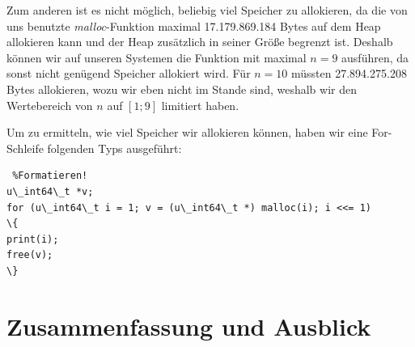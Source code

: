 \documentclass[course=asp]{aspdoc}
\begin{document}
Zum anderen ist es nicht m\"oglich, beliebig viel Speicher zu allokieren, da die von uns benutzte \textit{malloc}-Funktion maximal 17.179.869.184 Bytes auf dem Heap allokieren kann und der Heap zus\"atzlich in seiner Gr\"oße begrenzt ist. Deshalb k\"onnen wir auf unseren Systemen die Funktion mit maximal $n = 9$ ausf\"uhren, da sonst nicht gen\"ugend Speicher allokiert wird. F\"ur $n = 10$ m\"ussten 27.894.275.208 Bytes allokieren, wozu wir eben nicht im Stande sind, weshalb wir den Wertebereich von $n$ auf $[1;9]$ limitiert haben.

Um zu ermitteln, wie viel Speicher wir allokieren k\"onnen, haben wir eine For-Schleife  folgenden Typs ausgef\"uhrt:


\begin{lstlisting} %Formatieren! 
u\_int64\_t *v;    	
for (u\_int64\_t i = 1; v = (u\_int64\_t *) malloc(i); i <<= 1)   
\{     
print(i);
free(v); 
\}
\end{lstlisting}



\newpage
\section{Zusammenfassung und Ausblick}


{}
\end{document}
